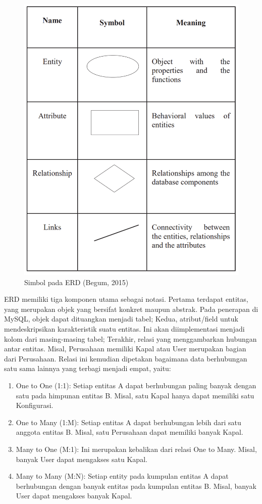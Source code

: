 \begin{figure}[!h]
    \includegraphics[width=.62\linewidth, center]{images/tinjauan-pustaka/fig-erd.png}
    \caption{Simbol pada ERD (Begum, 2015)}
    \label{fig:erd-notation}
\end{figure}

ERD memiliki tiga komponen utama sebagai notasi. Pertama terdapat entitas, yang merupakan objek yang bersifat konkret maupun abstrak. Pada penerapan di MySQL, objek dapat dituangkan menjadi tabel; Kedua, atribut/field untuk mendeskripsikan karakteristik suatu entitas. Ini akan diimplementasi menjadi kolom dari masing-masing tabel; Terakhir, relasi yang menggambarkan hubungan antar entitas. Misal, Perusahaan memiliki Kapal atau User merupakan bagian dari Perusahaan. Relasi ini kemudian dipetakan bagaimana data berhubungan satu sama lainnya yang terbagi menjadi empat, yaitu:
\begin{enumerate}
    \item One to One (1:1): Setiap entitas A dapat berhubungan paling banyak dengan satu pada himpunan entitas B. Misal, satu Kapal hanya dapat memiliki satu Konfigurasi.
    \item One to Many (1:M): Setiap entitas A dapat berhubungan lebih dari satu anggota entitas B. Misal, satu Perusahaan dapat memiliki banyak Kapal.
    \item Many to One (M:1): Ini merupakan kebalikan dari relasi One to Many. Misal, banyak User dapat mengakses satu Kapal.
    \item Many to Many (M:N): Setiap entity pada kumpulan entitas A dapat berhubungan dengan banyak entitas pada kumpulan entitas B. Misal, banyak User dapat mengakses banyak Kapal.
\end{enumerate}


